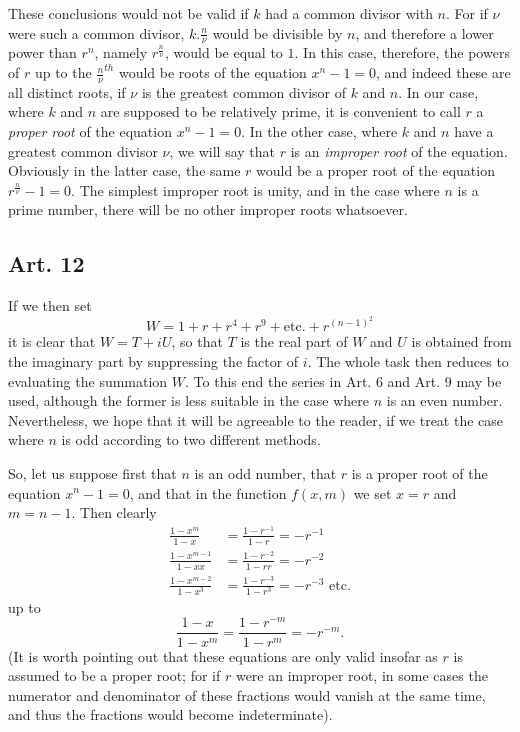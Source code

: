 \documentclass{book}
\theoremstyle{plain}
\theoremstyle{remark}
\begin{document}
These conclusions would not be valid if $k$ had a common divisor with $n$.   For if $\nu$ were such a common divisor, $k.\frac{n}{\nu}$ would be divisible by $n$, and therefore a lower power than $r^n$, namely $r^{\frac{n}{\nu}}$, would be equal to $1$.  In this case, therefore, the powers of $r$ up to the $\frac{n}{\nu}^{th}$ would be roots of the equation $x^n-1=0$, and indeed these are all distinct roots, if $\nu$ is the greatest common divisor of $k$ and $n$.   In our case, where $k$ and $n$ are supposed to be relatively prime, it is convenient to call $r$ a \emph{proper root} of the equation $x^n-1=0$.  In the other case, where $k$ and $n$ have a greatest common divisor $\nu$, we will say that $r$ is an \emph{improper root} of the equation.  Obviously in the latter case, the same $r$ would be a proper root of the equation $r^{\frac{n}{\nu}} -1 =0$.  The simplest improper root is unity, and in the case where $n$ is a prime number, there will be no other improper roots whatsoever.

\subsection*{Art. 12} 

If we then set 
\[ W = 1 + r + r^4 + r^9 + \textrm{etc.} + r^{(n-1)^2} \]
it is clear that $W = T +i U$,  so that $T$ is the real part of $W$ and $U$ is obtained from the imaginary part by suppressing the factor of $i$.  The whole task then reduces to evaluating the summation $W$.  To this end the series in Art. 6 and Art. 9 may be used, although the former is less suitable in the case where $n$ is an even number.  Nevertheless, we hope that it will be agreeable to the reader, if we treat the case where $n$ is odd according to two different methods.

So, let us suppose first that $n$ is an odd number, that $r$ is a proper root of the equation $x^n-1=0$, and that in the function $f(x,m)$ we set $x=r$ and $m=n-1$.  Then clearly 
\begin{align*} 
\frac{1-x^m}{1-x} &= \frac{1-r^{-1}}{1-r} = -r^{-1} \\
\frac{1-x^{m-1}}{1-xx} &= \frac{1-r^{-2}}{1-rr} = -r^{-2} \\
\frac{1-x^{m-2}}{1-x^3} &= \frac{1-r^{-3}}{1-r^3} = -r^{-3} \textrm{ etc.} 
\end{align*} 
up to 
\[ \frac{1-x}{1-x^m} = \frac{1-r^{-m}}{1-r^m} = -r^{-m}. \]
(It is worth pointing out that these equations are only valid insofar as $r$ is assumed to be a proper root; for if $r$ were an improper root, in some cases the numerator and denominator of these fractions would vanish at the same time, and thus the fractions would become indeterminate).
\end{document}
